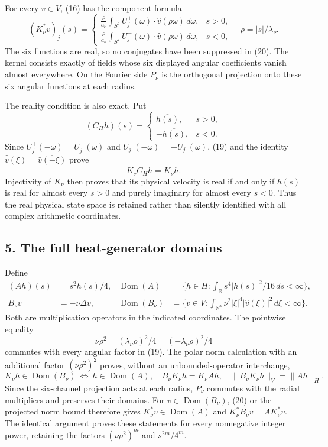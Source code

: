 For every \(v\in V\), (16) has the component formula \[
(K_\nu^*v)_j(s)=
\begin{cases}
\displaystyle\frac\rho{a_\nu}\int_{S^2}U_j^+(\omega)\cdot\widehat v(\rho\omega)\,d\omega,&s>0,\\
\displaystyle\frac\rho{a_\nu}\int_{S^2}U_j^-(\omega)\cdot\widehat v(\rho\omega)\,d\omega,&s<0,
\end{cases}
\quad \rho=|s|/\lambda_\nu.
\tag{20}
\] The six functions are real, so no conjugates have been suppressed in (20). The kernel consists exactly of fields whose six displayed angular coefficients vanish almost everywhere. On the Fourier side \(P_\nu\) is the orthogonal projection onto these six angular functions at each radius.

The reality condition is also exact. Put \[
(C_Hh)(s)=\begin{cases}\overline{h(s)},&s>0,\\-\overline{h(s)},&s<0.\end{cases}
\tag{21}
\] Since \(U_j^+(-\omega)=U_j^+(\omega)\) and \(U_j^-(-\omega)=-U_j^-(\omega)\), (19) and the identity \(\widehat{\overline v}(\xi)=\overline{\widehat v(-\xi)}\) prove \[
K_\nu C_Hh=\overline{K_\nu h}.
\tag{22}
\] Injectivity of \(K_\nu\) then proves that its physical velocity is real if and only if \(h(s)\) is real for almost every \(s>0\) and purely imaginary for almost every \(s<0\). Thus the real physical state space is retained rather than silently identified with all complex arithmetic coordinates.

\subsection{5. The full heat-generator domains}\label{the-full-heat-generator-domains}

Define \[
\begin{aligned}
(Ah)(s)&=s^2h(s)/4,&
\operatorname{Dom}(A)&=\{h\in H:\int_{\mathbb R}s^4|h(s)|^2/16\,ds<\infty\},\\
B_\nu v&=-\nu\Delta v,&
\operatorname{Dom}(B_\nu)&=\{v\in V:\int_{\mathbb R^3}\nu^2|\xi|^4|\widehat v(\xi)|^2\,d\xi<\infty\}.
\end{aligned}
\tag{23}
\] Both are multiplication operators in the indicated coordinates. The pointwise equality \[
\nu\rho^2=(\lambda_\nu\rho)^2/4=(-\lambda_\nu\rho)^2/4
\tag{24}
\] commutes with every angular factor in (19). The polar norm calculation with an additional factor \((\nu\rho^2)^2\) proves, without an unbounded-operator interchange, \[
K_\nu h\in\operatorname{Dom}(B_\nu)\ \Longleftrightarrow\ h\in\operatorname{Dom}(A),
\quad B_\nu K_\nu h=K_\nu Ah,
\quad\|B_\nu K_\nu h\|_V=\|Ah\|_H.
\tag{25}
\] Since the six-channel projection acts at each radius, \(P_\nu\) commutes with the radial multipliers and preserves their domains. For \(v\in\operatorname{Dom}(B_\nu)\), (20) or the projected norm bound therefore gives \(K_\nu^*v\in\operatorname{Dom}(A)\) and \(K_\nu^*B_\nu v=AK_\nu^*v\). The identical argument proves these statements for every nonnegative integer power, retaining the factors \((\nu\rho^2)^m\) and \(s^{2m}/4^m\).

